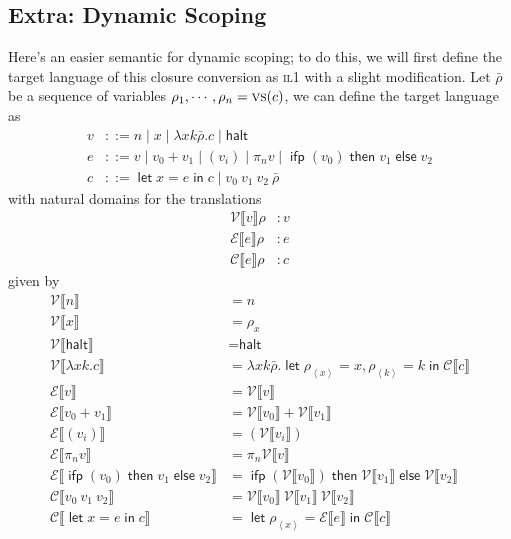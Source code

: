 \documentclass[11pt,a4paper]{article}
\newcommand {\coo} [1] {\ensuremath{\operatorname{\mathsf{#1}}}}
\newcommand {\co} [1] {\coo{#1}}
\newcommand {\Ifp}[3] {\co{ifp} (#1) \co{then} #2 \co{else} #3}
\newcommand{\Let}[1]{\coo{let} #1 \coo{in} }
\newcommand{\pa}[1]{\left(#1\right)}
\newcommand{\ba}[1]{\left\langle #1\right\rangle}
\newcommand{\f}[1]{\textsc{#1}}
\newcommand{\g}[1]{\textsf{#1}}
\newcommand{\trans}[2]{\ensuremath{\mathcal{#1}\llbracket #2\rrbracket}}
\begin{document}
\begin{enumerate}[label=\textbf{Excercise \arabic*\ }]
\begin{enumerate}
\subsection*{Extra: Dynamic Scoping}
Here's an easier semantic for dynamic scoping; to do this, we will first define the target language of this closure conversion as \f{il1} with a slight modification. Let $\bar\rho$ be a sequence of variables $\rho_1, \cdots, \rho_n = \f{vs}(c)$, we can define the target language as
\begin{align*}
v &::= n \mid x \mid \lambda xk\bar\rho.c \mid \g{halt} \\
e &::= v \mid v_0 + v_1 \mid (v_i) \mid \pi_n v \mid \Ifp{v_0}{v_1}{v_2} \\
c &::= \Let{x = e}{c} \mid v_0~v_1~v_2~\bar\rho
\end{align*}
with natural domains for the translations
\begin{align*}
\trans{V}{v} \rho &: v \\
\trans{E}{e} \rho &: e \\
\trans{C}{e} \rho &: c
\end{align*}
given by
\begin{align*}
\trans{V}{n} &= n \\
\trans{V}{x} &= \rho_{x} \\
\trans{V}{\g{halt}} &= \g{halt} \\
\trans{V}{\lambda xk.c} &= \lambda xk\bar\rho. \Let{\rho_{\ba{x}} = x, \rho_{\ba{k}} = k}{\trans{C}{c}} \\
\trans{E}{v} &= \trans{V}{v} \\
\trans{E}{v_0 + v_1} &= \trans{V}{v_0} + \trans{V}{v_1} \\
\trans{E}{(v_i)} &= \pa{\trans{V}{v_i}} \\
\trans{E}{\pi_n v} &= \pi_n \trans{V}{v} \\
\trans{E}{\Ifp{v_0}{v_1}{v_2}} &= \Ifp{\trans{V}{v_0}}{\trans{V}{v_1}}{\trans{V}{v_2}} \\
\trans{C}{v_0~v_1~v_2} &= \trans{V}{v_0}~\trans{V}{v_1}~\trans{V}{v_2} \\
\trans{C}{\Let{x = e}{c}} &= \Let{\rho_{\ba{x}} = \trans{E}{e}}{\trans{C}{c}}
\end{align*}


\end{enumerate}
\end{enumerate}
\end{document}

